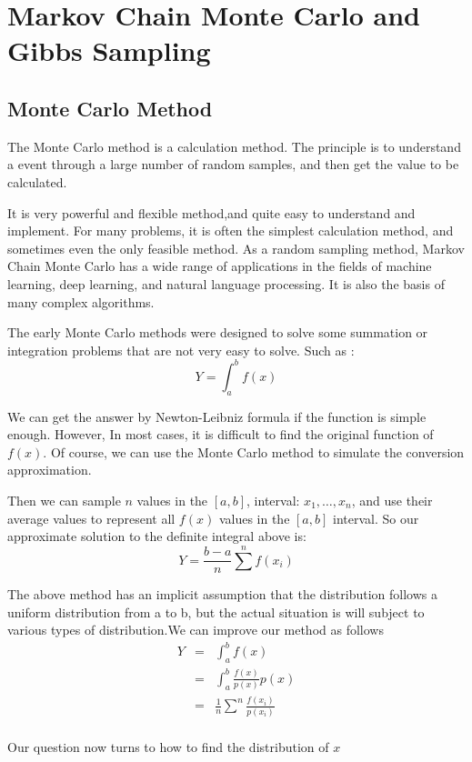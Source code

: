 \section{Markov Chain Monte Carlo and Gibbs Sampling}\label{bases}

\subsection{Monte Carlo Method}
The Monte Carlo method is a calculation method. The principle is to understand a event through a large number of random samples, and then get the value to be calculated.

It is very powerful and flexible method,and  quite easy to understand and  implement. For many problems, it is often the simplest calculation method, and sometimes even the only feasible method.
As a random sampling method, Markov Chain Monte Carlo has a wide range of applications in the fields of machine learning, deep learning, and natural language processing. It is also the basis of many complex algorithms.

The early Monte Carlo methods were designed to solve some summation or integration problems that are not very easy to solve. Such as :
\[
Y = \int_a^b f(x)

\]

We can get the answer by Newton-Leibniz formula if the function is simple enough. However,
In most cases, it is difficult to find the original function of $f(x)$. Of course, we can use the Monte Carlo method to simulate the conversion approximation.

Then we can sample $n$ values ​​in the $[a,b]$, interval: $x_1,\dots,x_n$, and use their average values ​​to represent all $f(x)$ values ​​in the $[a,b]$ interval. So our approximate solution to the definite integral above is:
\[
  Y = \frac{b-a}{n}\sum^n f(x_i)
\]

The above method has an implicit assumption that the distribution follows a uniform distribution from a to b, but the actual situation is will subject to  various types of distribution.We can improve our method as follows
\begin{eqnarray*}
Y &=& \int_a^b f(x) \\
  &=& \int_a^b \frac{f(x)}{p(x)}p(x) \\
  &=& \frac{1}{n} \sum^n \frac{f(x_i)}{p(x_i)}\\
\end{eqnarray*}

Our question now turns to how to find the distribution of $x$
